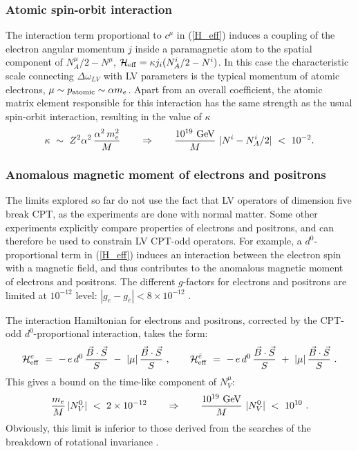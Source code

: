 \documentclass[12pt]{revtex4}
\begin{document}
\subsubsection*{Atomic spin-orbit interaction}


The interaction term proportional to $c^\mu$ in (\ref{H_eff}) induces
a coupling of the electron angular momentum $j$ inside a paramagnetic
atom to the spatial component of  
$N_A^\mu/2-N^\mu$, $\mathcal{H}_{\rm eff}= \kappa j_i (N^i_A/2-N^i) $. 
In this case the characteristic scale connecting 
$\Delta \omega_{LV}$ with LV parameters is the typical momentum 
of atomic electrons, $\mu \sim p_{\rm atomic} \sim \alpha m_e$. 
Apart from an overall coefficient, the atomic matrix element
 responsible for this interaction has the same strength as the usual spin-orbit 
 interaction, resulting in the value of $\kappa$
%
 \begin{equation}
 \kappa ~\sim~ Z^2\alpha^2 \, \frac{\alpha^2 \, m_e^2}{M}
\qquad \Rightarrow \qquad
\frac {10^{19}~{\rm GeV}}{M} ~ |N^i-N_A^i/2|~<~10^{-2}.
 \label{N_limit_atom}
 \end{equation}
%


\subsubsection*{Anomalous magnetic moment of electrons and positrons}


The limits explored so far do not use the fact that LV operators of
dimension five break CPT, as the experiments \cite{clock1,clock2} are
done with normal matter. Some other experiments explicitly compare
properties  of electrons and positrons, and can therefore be used 
to constrain LV CPT-odd operators. For example, a $ d^0 $-proportional
term in (\ref{H_eff}) induces an interaction between the electron spin
with a magnetic field, and thus contributes to the anomalous magnetic
moment of electrons and positrons. The different $g$-factors for
electrons and positrons are limited at $10^{-12}$ level: 
$|g_{e}-g_{\bar e}|< 8\times 10^{-12}$ \cite{Mittleman:1999it}.  

The interaction Hamiltonian for electrons and positrons, corrected by the 
CPT-odd $d^0$-proportional interaction, takes the form: 
\begin{equation}
 \mathcal{H}_{\rm eff}^{e} ~=~ 
-\, e\, d^0\, \frac{\vec{B}\cdot\vec{S}}{S}
~-~ 
|\mu|\, \frac{\vec{B}\cdot\vec{S}}{S}~, 
\qquad 
 \mathcal{H}_{\rm eff}^{\bar{e}} ~=~  
-\, e\, d^0\, \frac{\vec{B}\cdot\vec{S}}{S}
~+~ 
|\mu|\, \frac{\vec{B}\cdot\vec{S}}{S}~.
\end{equation}
%
This gives a bound on the time-like component of $N_V^\mu$: 
\begin{equation}
 \frac{m_e}{M}\,  |N_V^0| ~<~ 2\times 10^{-12} 
\qquad \Rightarrow \qquad 
\frac {10^{19}~{\rm GeV}}{M} ~ |N_V^0| ~<~ 10^{10} 
~.
\end{equation}
%
Obviously, this limit is inferior to those derived from the searches of
the breakdown of rotational invariance \cite{clock1,clock2}.
\end{document}
